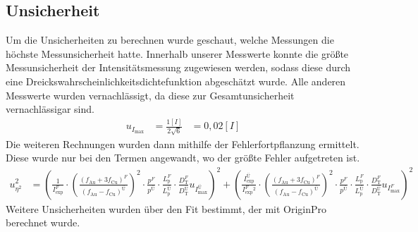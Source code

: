 \documentclass[
	a4paper,
	12pt,
	pagesize,
	ngerman
]{scrartcl}
\begin{document}
\subsection{Unsicherheit}
Um die Unsicherheiten zu berechnen wurde geschaut, welche Messungen die höchste Messunsicherheit hatte. Innerhalb unserer Messwerte konnte die größte Messunsicherheit der Intensitätsmessung zugewiesen werden, sodass diese durch eine Dreickswahrscheinlichkeitsdichtefunktion abgeschätzt wurde. Alle anderen Messwerte wurden vernachlässigt, da diese zur Gesamtunsicherheit vernachlässigar sind.
\begin{align*}
    u_{I_\text{max}} &= \frac{1[I]}{2\sqrt{6}} &= 0,02[I]
\end{align*}
Die weiteren Rechnungen wurden dann mithilfe der Fehlerfortpflanzung ermittelt. Diese wurde nur bei den Termen angewandt, wo der größte Fehler aufgetreten ist.
\begin{align*}
    u_{\eta^2}^2 &= ({\frac{1}{I_\text{exp}^{F}}}
    \cdot 
    ({\frac{(f_\text{Au}+3f_\text{Cu})^{F}}{(f_\text{Au}-f_\text{Cu})^{Ü}}})^{2}
    \cdot
    {\frac{p^{F}}{p^{Ü}}}
    \cdot
    {\frac{L_\text{p}^{F}}{L_\text{p}^{Ü}}}
    \cdot
    {\frac{D_\text{T}^{F}}{D_\text{T}^{Ü}}}u_{I_\text{max}^{Ü}})^2 + 
    ({\frac{I_\text{exp}^{Ü}}{I_\text{exp}^{F}^2}}
    \cdot 
    ({\frac{(f_\text{Au}+3f_\text{Cu})^{F}}{(f_\text{Au}-f_\text{Cu})^{Ü}}})^{2}
    \cdot
    {\frac{p^{F}}{p^{Ü}}}
    \cdot
    {\frac{L_\text{p}^{F}}{L_\text{p}^{Ü}}}
    \cdot
    {\frac{D_\text{T}^{F}}{D_\text{T}^{Ü}}}u_{I_\text{max}^{F}})^2
\end{align*}
Weitere Unsicherheiten wurden über den Fit bestimmt, der mit OriginPro berechnet wurde.
\end{document}
